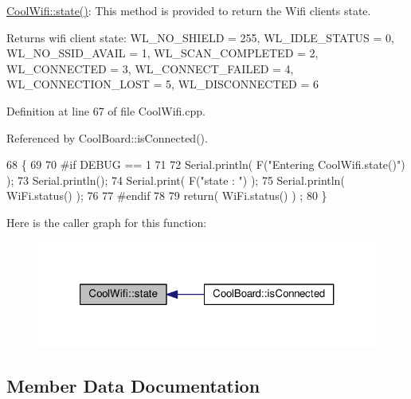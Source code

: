 \hyperlink{classCoolWifi_a1c7b4d82a4098d346e7593dce92039fa}{Cool\+Wifi\+::state()}\+: This method is provided to return the Wifi client\textquotesingle{}s state. \begin{DoxyReturn}{Returns}
wifi client state\+: W\+L\+\_\+\+N\+O\+\_\+\+S\+H\+I\+E\+LD = 255, W\+L\+\_\+\+I\+D\+L\+E\+\_\+\+S\+T\+A\+T\+US = 0, W\+L\+\_\+\+N\+O\+\_\+\+S\+S\+I\+D\+\_\+\+A\+V\+A\+IL = 1, W\+L\+\_\+\+S\+C\+A\+N\+\_\+\+C\+O\+M\+P\+L\+E\+T\+ED = 2, W\+L\+\_\+\+C\+O\+N\+N\+E\+C\+T\+ED = 3, W\+L\+\_\+\+C\+O\+N\+N\+E\+C\+T\+\_\+\+F\+A\+I\+L\+ED = 4, W\+L\+\_\+\+C\+O\+N\+N\+E\+C\+T\+I\+O\+N\+\_\+\+L\+O\+ST = 5, W\+L\+\_\+\+D\+I\+S\+C\+O\+N\+N\+E\+C\+T\+ED = 6 
\end{DoxyReturn}


Definition at line 67 of file Cool\+Wifi.\+cpp.



Referenced by Cool\+Board\+::is\+Connected().


\begin{DoxyCode}
68 \{
69 
70 \textcolor{preprocessor}{#if DEBUG == 1 }
71 
72     Serial.println( F(\textcolor{stringliteral}{"Entering CoolWifi.state()"}) );
73     Serial.println();   
74     Serial.print( F(\textcolor{stringliteral}{"state : "}) );
75     Serial.println( WiFi.status() );
76 
77 \textcolor{preprocessor}{#endif}
78     
79     \textcolor{keywordflow}{return}( WiFi.status() ) ;
80 \}
\end{DoxyCode}
Here is the caller graph for this function\+:
\nopagebreak
\begin{figure}[H]
\begin{center}
\leavevmode
\includegraphics[width=321pt]{classCoolWifi_a1c7b4d82a4098d346e7593dce92039fa_icgraph}
\end{center}
\end{figure}


\subsection{Member Data Documentation}
\mbox{\label{classCoolWifi_a0c3332a149245aaad060b32593a54c9b}} 
